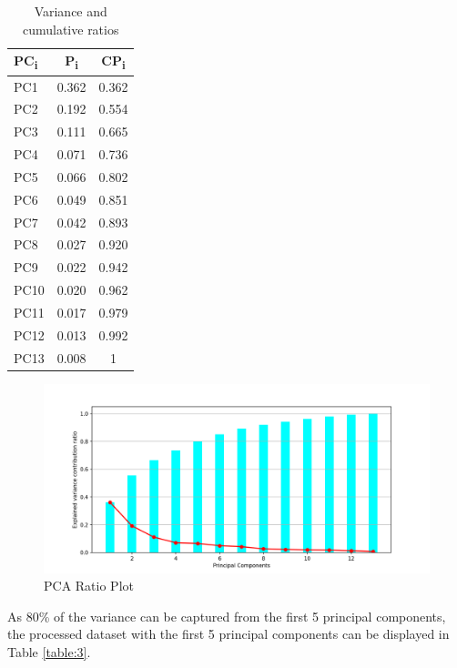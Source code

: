 \begin{table}[h]
	\centering
	\fontsize{10}{12}\selectfont
	\caption{Variance and cumulative ratios}
	\label{table:4}
	\label{variance contribution ratio of the principal components}
	\begin{tabular}{|p{3cm}|c|c|}
		\hline
		\textbf{PC\textsubscript{i}} & \textbf{P\textsubscript{i}} & \textbf{CP\textsubscript{i}} \\
		\hline
		PC1 & 0.362 & 0.362\\
		\hline
		PC2 & 0.192 & 0.554\\
		\hline
		PC3 & 0.111 & 0.665\\
		\hline
		PC4 & 0.071 & 0.736\\
		\hline
		PC5 & 0.066 & 0.802\\
		\hline
		PC6 & 0.049 & 0.851\\
		\hline
		PC7 & 0.042 & 0.893\\
		\hline
		PC8 & 0.027 & 0.920\\
		\hline
		PC9 & 0.022 & 0.942\\
		\hline
		PC10 & 0.020 & 0.962\\
		\hline
		PC11 & 0.017 & 0.979\\
		\hline
		PC12 & 0.013 & 0.992\\
		\hline
		PC13 & 0.008 & 1\\
		\hline
	\end{tabular}
\end{table}

\begin{figure}[H]
	\centerline{\includegraphics[scale = 0.75]{Figures/variance graph 2.png}}
	\caption{PCA Ratio Plot}
	\label{pca ratio plot}
\end{figure}

As 80\% of the variance can be captured from the first 5 principal components, the processed dataset with the first 5 principal components can be displayed in Table \ref{table:3}.

